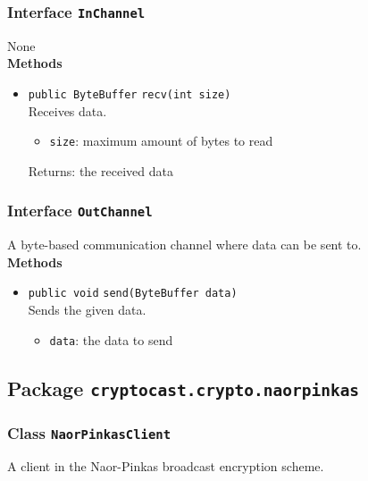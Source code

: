 \subsubsection{Interface \lstinline|InChannel|}
None \\





\textbf{Methods}
\begin{itemize}
\item \lstinline|public ByteBuffer| \lstinline|recv|\lstinline|(int size)|\\
Receives data.
\begin{itemize}
\item \lstinline|size|: maximum amount of bytes to read
\end{itemize}

Returns: the received data

\end{itemize}

\subsubsection{Interface \lstinline|OutChannel|}
A byte-based communication channel where data can be sent to. \\





\textbf{Methods}
\begin{itemize}
\item \lstinline|public void| \lstinline|send|\lstinline|(ByteBuffer data)|\\
Sends the given data.
\begin{itemize}
\item \lstinline|data|: the data to send
\end{itemize}



\end{itemize}


\subsection{Package \lstinline!cryptocast.crypto.naorpinkas!}
\subsubsection{Class \lstinline|NaorPinkasClient|}
A client in the Naor-Pinkas broadcast encryption scheme. \\


